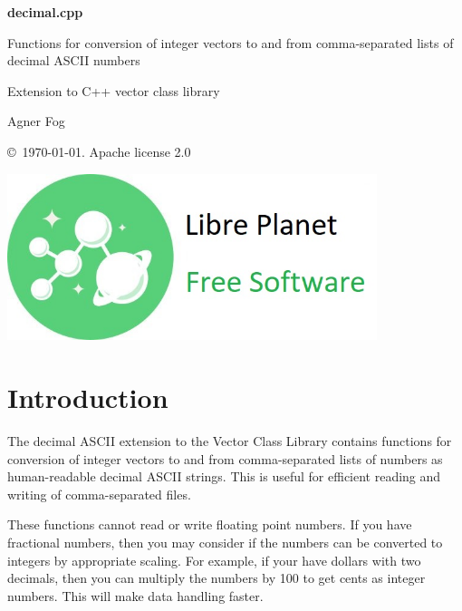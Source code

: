 \documentclass[11pt,a4paper,oneside,openright]{report}
\newcommand{\vspacesmall}{\vspace{3mm}}
\newcommand{\vspacebig}{\vspace{6mm}}
\begin{document}
\begin{titlepage}
    \centering
   
    \null %
    \vfill

   {\bfseries\Huge
    decimal.cpp
    \vspacesmall
    
    Functions for conversion of integer vectors to and from
    comma-separated lists of   
    decimal ASCII numbers
    \vspacesmall
        
    Extension to C++ vector class library 
    \vspacebig
        
   }        
    \vspacebig
    
   {\Large    
    Agner Fog
    \vspacebig
    
    \copyright\ \today. Apache license 2.0
   }
    
    \vfill
    
    \includegraphics[width=306pt]{freesoftwarelogo.jpg}
    \vfill
    
\end{titlepage}

\RaggedRight

\chapter{Introduction}\label{chap:Introduction}
The decimal ASCII extension to the Vector Class Library contains functions for conversion of integer vectors to and from comma-separated lists of numbers as human-readable decimal ASCII strings. This is useful for efficient reading and writing of comma-separated files.
\vspacesmall

These functions cannot read or write floating point numbers. If you have fractional numbers, then you may consider if the numbers can be converted to integers by appropriate scaling. For example, if your have dollars with two decimals, then you can multiply the numbers by 100 to get cents as integer numbers. This will make data handling faster.
\vspacesmall
\end{document}
